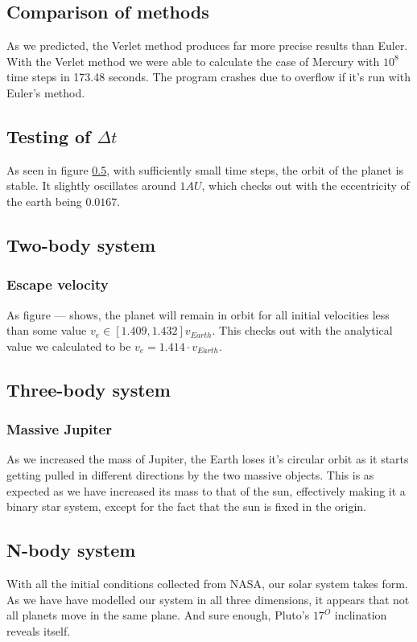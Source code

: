 \documentclass[10pt]{article}
\begin{document}
\begin{multicols}{2}

\subsection{Comparison of methods}
As we predicted, the Verlet method produces far more precise results than Euler. With the Verlet method we were able to calculate the case of Mercury with $10^8$ time steps in 173.48 seconds. The program crashes due to overflow if it's run with Euler's method.
\subsection{Testing of $\Delta t$}
As seen in figure \cref{}, with sufficiently small time steps, the orbit
of the planet is stable. It slightly oscillates around $1AU$, which checks
out with the eccentricity of the earth being $0.0167$.

\subsection{Two-body system}
\subsubsection{Escape velocity}
As figure --- shows, the planet will remain in orbit for all initial velocities less than some value $v_e \in [1.409,1.432]v_{Earth}$. This checks out with the analytical value we calculated to be $v_e = 1.414\cdot v_{Earth}$.

\subsection{Three-body system}
\subsubsection{Massive Jupiter}
As we increased the mass of Jupiter, the Earth loses it's circular orbit as it starts getting pulled in different directions by the two massive objects. This is as expected as we have increased its mass to that of the sun, effectively making it a binary star system, except for the fact that the sun is fixed in the origin. 


\subsection{N-body system}
With all the initial conditions collected from NASA, our solar system takes form. As we have have modelled our system in all three dimensions, it appears that not all planets move in the same plane. And sure enough, Pluto's $17^O$ inclination reveals itself.






\end{multicols}
\end{document}
